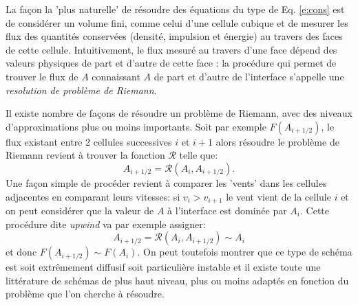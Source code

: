 La façon la 'plus naturelle' de résoudre des équations du type de Eq. \ref{e:cons} est de considérer un volume fini, comme celui d'une cellule cubique et de mesurer les flux des quantités conservées (densité, impulsion et énergie) au travers des faces de cette cellule. Intuitivement, le flux mesuré au travers d'une face dépend des valeurs physiques de part et d'autre de cette face : la procédure qui permet de trouver le flux de $A$ connaissant $A$ de part et d'autre de l'interface s'appelle une \textit{resolution de problème de Riemann}.

 Il existe nombre de façons de résoudre un problème de Riemann, avec des niveaux d'approximations plus ou moins importants. Soit par exemple $F(A_{i+1/2})$, le flux existant entre 2 cellules successives $i$ et $i+1$ alors résoudre le problème de Riemann revient à trouver la fonction $\mathcal R$ telle que:
 \begin{equation}
 A_{i+1/2}=\mathcal{R}(A_i, A_{i+1/2}).
 \end{equation}
 Une façon simple de procéder revient à comparer les 'vents' dans les cellules adjacentes en comparant leurs vitesses: si $v_i>v_{i+1}$ le vent vient de la cellule $i$ et on peut considérer que la valeur de $A$ à l'interface est dominée par $A_i$. Cette procédure dite \textit{upwind} va par exemple assigner:
  \begin{equation}
 A_{i+1/2}=\mathcal{R}(A_i, A_{i+1/2})\sim A_i
 \end{equation}
 et donc $F(A_{i+1/2})\sim F(A_{i})$. On peut toutefois montrer que ce type de schéma est soit extrêmement diffusif soit particulière instable et il existe toute une littérature de schémas de plus haut niveau, plus ou moins adaptés en fonction du problème que l'on cherche à résoudre.
 
